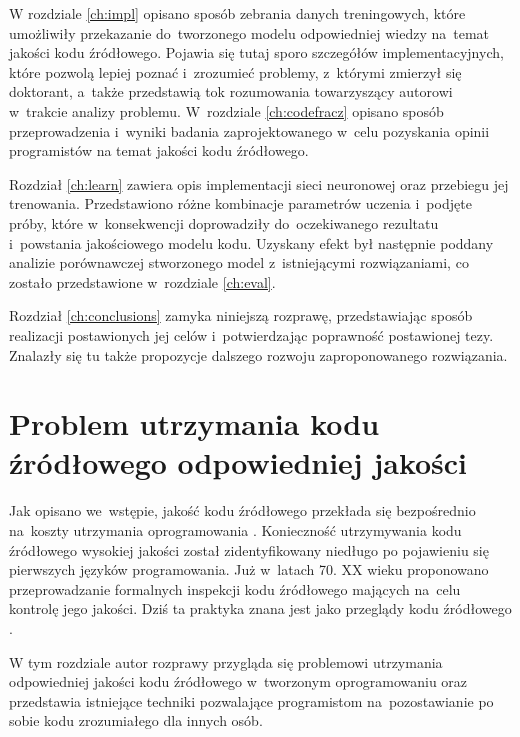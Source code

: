 \documentclass[twoside]{praca}
\begin{document}
W rozdziale \ref{ch:impl} opisano sposób zebrania danych treningowych, które umożliwiły przekazanie do~tworzonego modelu odpowiedniej wiedzy na~temat jakości kodu źródłowego. Pojawia się tutaj sporo szczegółów implementacyjnych, które pozwolą lepiej poznać i~zrozumieć problemy, z~którymi zmierzył się doktorant, a~także przedstawią tok rozumowania towarzyszący autorowi w~trakcie analizy problemu. W~rozdziale \ref{ch:codefracz} opisano sposób przeprowadzenia i~wyniki badania zaprojektowanego w~celu pozyskania opinii programistów na temat jakości kodu źródłowego.

Rozdział \ref{ch:learn} zawiera opis implementacji sieci neuronowej oraz przebiegu jej trenowania. Przedstawiono różne kombinacje parametrów uczenia i~podjęte próby, które w~konsekwencji doprowadziły do~oczekiwanego rezultatu i~powstania jakościowego modelu kodu. Uzyskany efekt był następnie poddany analizie porównawczej stworzonego model z~istniejącymi rozwiązaniami, co zostało przedstawione w~rozdziale \ref{ch:eval}.

Rozdział \ref{ch:conclusions} zamyka niniejszą rozprawę, przedstawiając sposób realizacji postawionych jej celów i~potwierdzając poprawność postawionej tezy. Znalazły się tu także propozycje dalszego rozwoju zaproponowanego rozwiązania.

\cleardoublepage
\chapter{Problem utrzymania kodu źródłowego odpowiedniej jakości}
\label{ch:related}

\begin{addmargin}{1cm}
Jak opisano we~wstępie, jakość kodu źródłowego przekłada się bezpośrednio na~koszty utrzymania oprogramowania \cite{collar2006role}. Konieczność utrzymywania kodu źródłowego wysokiej jakości został zidentyfikowany niedługo po pojawieniu się pierwszych języków programowania. Już w~latach 70. XX wieku proponowano przeprowadzanie formalnych inspekcji kodu źródłowego \cite{Fagan1976} mających na~celu kontrolę jego jakości. Dziś ta praktyka znana jest jako przeglądy kodu źródłowego \cite{beller2014modern}.

W tym rozdziale autor rozprawy przygląda się problemowi utrzymania odpowiedniej jakości kodu źródłowego w~tworzonym oprogramowaniu oraz przedstawia istniejące techniki pozwalające programistom na~pozostawianie po sobie kodu zrozumiałego dla innych osób.
\end{addmargin}
\end{document}
